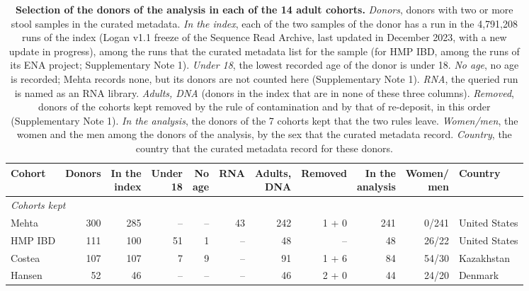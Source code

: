 \documentclass[11pt,a4paper]{article}
\begin{document}
\setcounter{table}{1}
\begin{table}[!htbp]\centering\footnotesize\setlength{\tabcolsep}{3pt}
\caption[Selection of the donors of the analysis in each of the 14 adult cohorts]{\textbf{Selection of the donors of the analysis in each of the 14 adult cohorts.} \textit{Donors}, donors with two or more stool samples in the curated metadata. \textit{In the index}, each of the two samples of the donor has a run in the 4,791,208 runs of the index (Logan v1.1 freeze of the Sequence Read Archive, last updated in December 2023, with a new update in progress), among the runs that the curated metadata list for the sample (for HMP IBD, among the runs of its ENA project; Supplementary Note 1). \textit{Under 18}, the lowest recorded age of the donor is under 18. \textit{No age}, no age is recorded; Mehta records none, but its donors are not counted here (Supplementary Note 1). \textit{RNA}, the queried run is named as an RNA library. \textit{Adults, DNA} (donors in the index that are in none of these three columns). \textit{Removed}, donors of the cohorts kept removed by the rule of contamination and by that of re-deposit, in this order (Supplementary Note 1). \textit{In the analysis}, the donors of the 7 cohorts kept that the two rules leave. \textit{Women/men}, the women and the men among the donors of the analysis, by the sex that the curated metadata record. \textit{Country}, the country that the curated metadata record for these donors.}
\begin{tabular}{lrrrrrrrrrl}
\toprule
Cohort & Donors & \makecell[rb]{In the\\index} & \makecell[rb]{Under\\18} & \makecell[rb]{No\\age} & RNA & \makecell[rb]{Adults,\\DNA} & Removed & \makecell[rb]{In the\\analysis} & \makecell[rb]{Women/\\men} & Country \\
\midrule
\multicolumn{11}{l}{\textit{Cohorts kept}} \\
Mehta & 300 & 285 & -- & -- & 43 & 242 & 1 + 0 & 241 & 0/241 & United States \\
HMP IBD & 111 & 100 & 51 & 1 & -- & 48 & -- & 48 & 26/22 & United States \\
Costea & 107 & 107 & 7 & 9 & -- & 91 & 1 + 6 & 84 & 54/30 & Kazakhstan \\
Hansen & 52 & 46 & -- & -- & -- & 46 & 2 + 0 & 44 & 24/20 & Denmark \\

\end{tabular}
\end{table}
\end{document}
